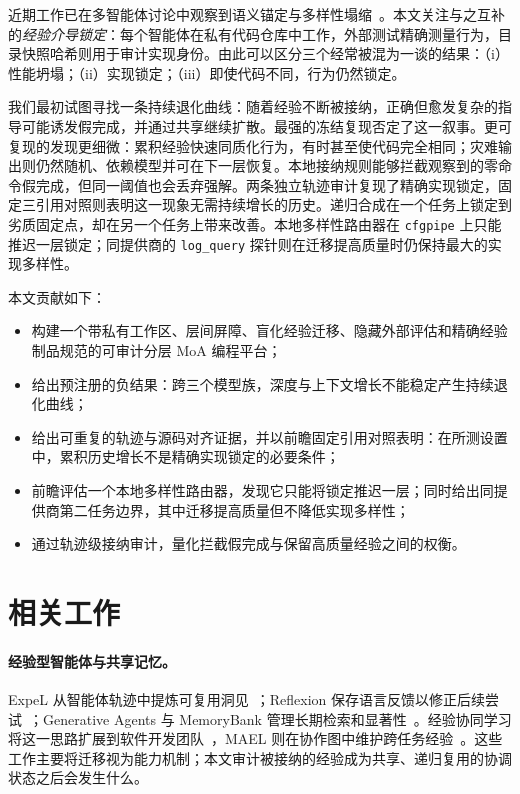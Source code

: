 \documentclass[UTF8,letterpaper,10pt,twocolumn]{ctexart}
\begin{document}
近期工作已在多智能体讨论中观察到语义锚定与多样性塌缩~\citep{guo2026diversitycollapse,zhang2026semanticcollapse}。本文关注与之互补的\emph{经验介导锁定}：每个智能体在私有代码仓库中工作，外部测试精确测量行为，目录快照哈希则用于审计实现身份。由此可以区分三个经常被混为一谈的结果：（i）性能坍塌；（ii）实现锁定；（iii）即使代码不同，行为仍然锁定。

我们最初试图寻找一条持续退化曲线：随着经验不断被接纳，正确但愈发复杂的指导可能诱发假完成，并通过共享继续扩散。最强的冻结复现否定了这一叙事。更可复现的发现更细微：累积经验快速同质化行为，有时甚至使代码完全相同；灾难输出则仍然随机、依赖模型并可在下一层恢复。本地接纳规则能够拦截观察到的零命令假完成，但同一阈值也会丢弃强解。两条独立轨迹审计复现了精确实现锁定，固定三引用对照则表明这一现象无需持续增长的历史。递归合成在一个任务上锁定到劣质固定点，却在另一个任务上带来改善。本地多样性路由器在 \texttt{cfgpipe} 上只能推迟一层锁定；同提供商的 \texttt{log\_query} 探针则在迁移提高质量时仍保持最大的实现多样性。

本文贡献如下：
\begin{itemize}
    \item 构建一个带私有工作区、层间屏障、盲化经验迁移、隐藏外部评估和精确经验制品规范的可审计分层 MoA 编程平台；
    \item 给出预注册的负结果：跨三个模型族，深度与上下文增长不能稳定产生持续退化曲线；
    \item 给出可重复的轨迹与源码对齐证据，并以前瞻固定引用对照表明：在所测设置中，累积历史增长不是精确实现锁定的必要条件；
    \item 前瞻评估一个本地多样性路由器，发现它只能将锁定推迟一层；同时给出同提供商第二任务边界，其中迁移提高质量但不降低实现多样性；
    \item 通过轨迹级接纳审计，量化拦截假完成与保留高质量经验之间的权衡。
\end{itemize}

\section{相关工作}

\paragraph{经验型智能体与共享记忆。}
ExpeL 从智能体轨迹中提炼可复用洞见~\citep{zhao2024expel}；Reflexion 保存语言反馈以修正后续尝试~\citep{shinn2023reflexion}；Generative Agents 与 MemoryBank 管理长期检索和显著性~\citep{park2023generative,zhong2024memorybank}。经验协同学习将这一思路扩展到软件开发团队~\citep{qian2024colearning}，MAEL 则在协作图中维护跨任务经验~\citep{li2025mael_full}。这些工作主要将迁移视为能力机制；本文审计被接纳的经验成为共享、递归复用的协调状态之后会发生什么。
\end{document}
